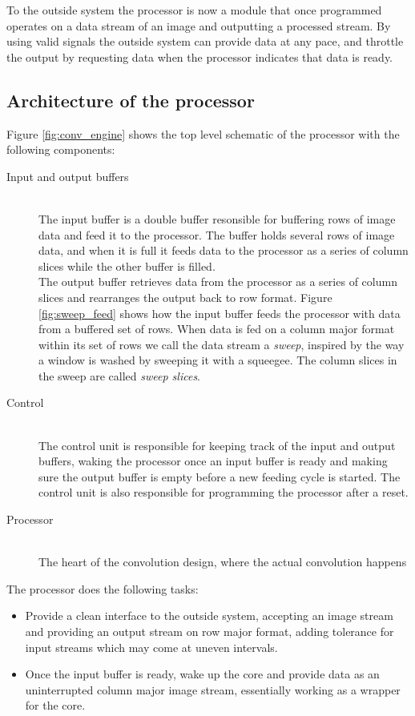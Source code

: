 To the outside system the processor is now a module that once programmed operates on a data stream of an image and outputting a processed stream. 
By using valid signals the outside system can provide data at any pace, and throttle the output by requesting data when the processor indicates that data is ready. 

\subsection{Architecture of the processor}

Figure \ref{fig:conv_engine} shows the top level schematic of the processor with the following components:

\begin{description}
    \item[Input and output buffers] \hfill\\
        The input buffer is a double buffer resonsible for buffering rows of image data and feed it to the processor.
        The buffer holds several rows of image data, and when it is full it feeds data to the processor as a series of column slices while the other buffer is filled.\\
        The output buffer retrieves data from the processor as a series of column slices and rearranges the output back to row format.
        Figure \ref{fig:sweep_feed} shows how the input buffer feeds the processor with data from a buffered set of rows.
        When data is fed on a column major format within its set of rows we call the data stream a \textit{sweep}, inspired by the way a window is washed by sweeping it with a squeegee.
        The column slices in the sweep are called \textit{sweep slices}.
    \item[Control] \hfill\\
        The control unit is responsible for keeping track of the input and output buffers, waking the processor once an input buffer is ready and making sure the output buffer is empty before a new feeding cycle is started.
        The control unit is also responsible for programming the processor after a reset.
    \item[Processor] \hfill\\
        The heart of the convolution design, where the actual convolution happens
\end{description}

The processor does the following tasks:
\begin{itemize}
    \item Provide a clean interface to the outside system, accepting an image stream and providing an output stream on row major format, adding tolerance for input streams which may come at uneven intervals. 
    \item Once the input buffer is ready, wake up the core and provide data as an uninterrupted column major image stream, essentially working as a wrapper for the core.
\end{itemize}

